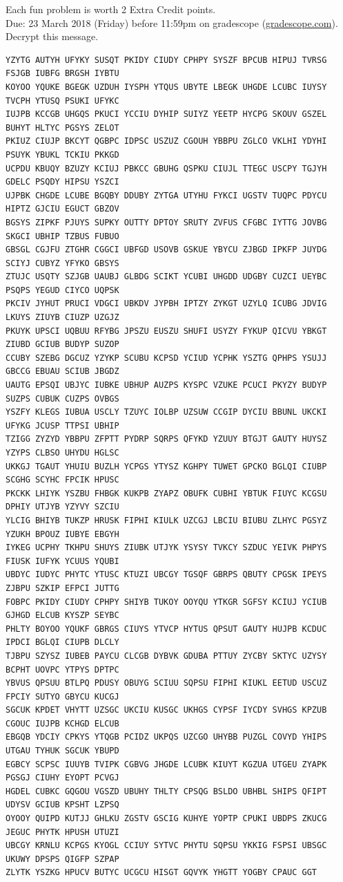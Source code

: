 \documentclass{article}
\theoremstyle{definition}
\begin{document}
\noindent
Each fun problem is worth 2 Extra Credit points.\\
Due: 23 March 2018 (Friday) before 11:59pm on gradescope (\url{gradescope.com}).\\

\noindent
Decrypt this message.

\begin{verbatim}
YZYTG AUTYH UFYKY SUSQT PKIDY CIUDY CPHPY SYSZF BPCUB HIPUJ TVRSG FSJGB IUBFG BRGSH IYBTU
KOYOO YQUKE BGEGK UZDUH IYSPH YTQUS UBYTE LBEGK UHGDE LCUBC IUYSY TVCPH YTUSQ PSUKI UFYKC
IUJPB KCCGB UHGQS PKUCI YCCIU DYHIP SUIYZ YEETP HYCPG SKOUV GSZEL BUHYT HLTYC PGSYS ZELOT
PKIUZ CIUJP BKCYT QGBPC IDPSC USZUZ CGOUH YBBPU ZGLCO VKLHI YDYHI PSUYK YBUKL TCKIU PKKGD
UCPDU KBUQY BZUZY KCIUJ PBKCC GBUHG QSPKU CIUJL TTEGC USCPY TGJYH GDELC PSQDY HIPSU YSZCI
UJPBK CHGDE LCUBE BGQBY DDUBY ZYTGA UTYHU FYKCI UGSTV TUQPC PDYCU HIPTZ GJCIU EGUCT GBZOV
BGSYS ZIPKF PJUYS SUPKY OUTTY DPTOY SRUTY ZVFUS CFGBC IYTTG JOVBG SKGCI UBHIP TZBUS FUBUO
GBSGL CGJFU ZTGHR CGGCI UBFGD USOVB GSKUE YBYCU ZJBGD IPKFP JUYDG SCIYJ CUBYZ YFYKO GBSYS
ZTUJC USQTY SZJGB UAUBJ GLBDG SCIKT YCUBI UHGDD UDGBY CUZCI UEYBC PSQPS YEGUD CIYCO UQPSK
PKCIV JYHUT PRUCI VDGCI UBKDV JYPBH IPTZY ZYKGT UZYLQ ICUBG JDVIG LKUYS ZIUYB CIUZP UZGJZ
PKUYK UPSCI UQBUU RFYBG JPSZU EUSZU SHUFI USYZY FYKUP QICVU YBKGT ZIUBD GCIUB BUDYP SUZOP
CCUBY SZEBG DGCUZ YZYKP SCUBU KCPSD YCIUD YCPHK YSZTG QPHPS YSUJJ GBCCG EBUAU SCIUB JBGDZ
UAUTG EPSQI UBJYC IUBKE UBHUP AUZPS KYSPC VZUKE PCUCI PKYZY BUDYP SUZPS CUBUK CUZPS OVBGS
YSZFY KLEGS IUBUA USCLY TZUYC IOLBP UZSUW CCGIP DYCIU BBUNL UKCKI UFYKG JCUSP TTPSI UBHIP
TZIGG ZYZYD YBBPU ZFPTT PYDRP SQRPS QFYKD YZUUY BTGJT GAUTY HUYSZ YZYPS CLBSO UHYDU HGLSC
UKKGJ TGAUT YHUIU BUZLH YCPGS YTYSZ KGHPY TUWET GPCKO BGLQI CIUBP SCGHG SCYHC FPCIK HPUSC
PKCKK LHIYK YSZBU FHBGK KUKPB ZYAPZ OBUFK CUBHI YBTUK FIUYC KCGSU DPHIY UTJYB YZYVY SZCIU
YLCIG BHIYB TUKZP HRUSK FIPHI KIULK UZCGJ LBCIU BIUBU ZLHYC PGSYZ YZUKH BPOUZ IUBYE EBGYH
IYKEG UCPHY TKHPU SHUYS ZIUBK UTJYK YSYSY TVKCY SZDUC YEIVK PHPYS FIUSK IUFYK YCUUS YQUBI
UBDYC IUDYC PHYTC YTUSC KTUZI UBCGY TGSQF GBRPS QBUTY CPGSK IPEYS ZJBPU SZKIP EFPCI JUTTG
FOBPC PKIDY CIUDY CPHPY SHIYB TUKOY OOYQU YTKGR SGFSY KCIUJ YCIUB GJHGD ELCUB KYSZP SEYBC
PHLTY BOYOO YQUKF GBRGS CIUYS YTVCP HYTUS QPSUT GAUTY HUJPB KCDUC IPDCI BGLQI CIUPB DLCLY
TJBPU SZYSZ IUBEB PAYCU CLCGB DYBVK GDUBA PTTUY ZYCBY SKTYC UZYSY BCPHT UOVPC YTPYS DPTPC
YBVUS QPSUU BTLPQ PDUSY OBUYG SCIUU SQPSU FIPHI KIUKL EETUD USCUZ FPCIY SUTYO GBYCU KUCGJ
SGCUK KPDET VHYTT UZSGC UKCIU KUSGC UKHGS CYPSF IYCDY SVHGS KPZUB CGOUC IUJPB KCHGD ELCUB
EBGQB YDCIY CPKYS YTQGB PCIDZ UKPQS UZCGO UHYBB PUZGL COVYD YHIPS UTGAU TYHUK SGCUK YBUPD
EGBCY SCPSC IUUYB TVIPK CGBVG JHGDE LCUBK KIUYT KGZUA UTGEU ZYAPK PGSGJ CIUHY EYOPT PCVGJ
HGDEL CUBKC GQGOU VGSZD UBUHY THLTY CPSQG BSLDO UBHBL SHIPS QFIPT UDYSV GCIUB KPSHT LZPSQ
OYOOY QUIPD KUTJJ GHLKU ZGSTV GSCIG KUHYE YOPTP CPUKI UBDPS ZKUCG JEGUC PHYTK HPUSH UTUZI
UBCGY KRNLU KCPGS KYOGL CCIUY SYTVC PHYTU SQPSU YKKIG FSPSI UBSGC UKUWY DPSPS QIGFP SZPAP
ZLYTK YSZKG HPUCV BUTYC UCGCU HISGT GQVYK YHGTT YOGBY CPAUC GGT
\end{verbatim}
\end{document}
